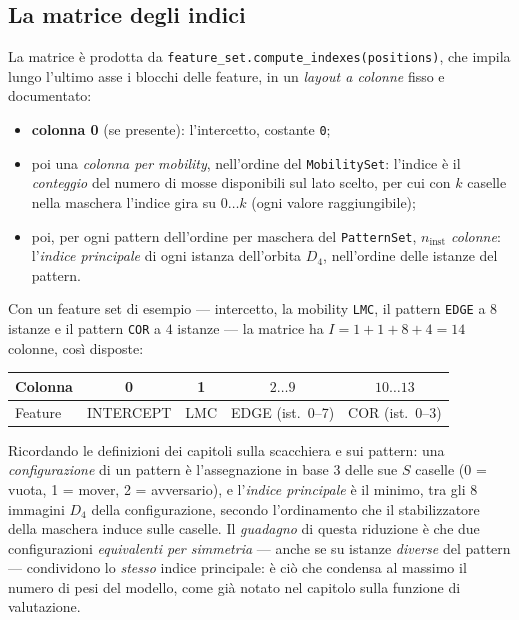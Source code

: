 \subsection{La matrice degli indici}

La matrice è prodotta da
\texttt{feature\_set.compute\_indexes(positions)}, che impila lungo l'ultimo
asse i blocchi delle feature, in un \emph{layout a colonne} fisso e
documentato:

\begin{itemize}
  \item \textbf{colonna 0} (se presente): l'intercetto, costante \texttt{0};
  \item poi una \emph{colonna per mobility}, nell'ordine del
        \texttt{MobilitySet}: l'indice è il \emph{conteggio} del numero di
        mosse disponibili sul lato scelto, per cui con $k$ caselle nella
        maschera l'indice gira su $0 \ldots k$ (ogni valore raggiungibile);
  \item poi, per ogni pattern dell'ordine per maschera del
        \texttt{PatternSet}, \emph{$n_{\text{inst}}$ colonne}: l'\emph{indice
        principale} di ogni istanza dell'orbita $D_4$, nell'ordine delle istanze
        del pattern.
\end{itemize}

Con un feature set di esempio — intercetto, la mobility \texttt{LMC}, il
pattern \texttt{EDGE} a $8$ istanze e il pattern \texttt{COR} a $4$ istanze —
la matrice ha $I = 1 + 1 + 8 + 4 = 14$ colonne, così disposte:

\begin{center}
\small
\begin{tabular}{l|c|c|c|c}
\toprule
Colonna & 0 & 1 & $2 \ldots 9$ & $10 \ldots 13$ \\
\midrule
Feature & INTERCEPT & LMC & EDGE (ist.\ 0--7) & COR (ist.\ 0--3) \\
\bottomrule
\end{tabular}
\end{center}

Ricordando le definizioni dei capitoli sulla scacchiera e sui pattern: una
\emph{configurazione} di un pattern è l'assegnazione in base 3 delle sue $S$
caselle (0 = vuota, 1 = mover, 2 = avversario), e l'\emph{indice principale}
è il minimo, tra gli $8$ immagini $D_4$ della configurazione, secondo
l'ordinamento che il stabilizzatore della maschera induce sulle caselle.
Il \emph{guadagno} di questa riduzione è che due configurazioni
\emph{equivalenti per simmetria} — anche se su istanze \emph{diverse} del
pattern — condividono lo \emph{stesso} indice principale: è ciò che condensa
al massimo il numero di pesi del modello, come già notato nel capitolo sulla
funzione di valutazione.


